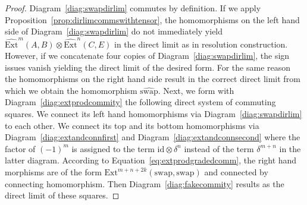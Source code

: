 \documentclass[12pt, a4paper]{article}
\numberwithin{equation}{section}
\theoremstyle{empty}
\theoremstyle{nonumberplain}
\newtheorem{proof}{Proof}
\begin{document}
\begin{proof}
Diagram~\ref{diag:swapdirlim} commutes by definition. If we apply Proposition~\ref{prop:dirlimcommswithtensor}, the homomorphisms on the left hand side of Diagram~\ref{diag:swapdirlim} do not immediately yield $\widehat{\mathrm{Ext}}^m(A, B) \otimes \widehat{\mathrm{Ext}}^n(C, E)$ in the direct limit as in resolution construction. However, if we concatenate four copies of Diagram~\ref{diag:swapdirlim}, the sign issues vanish yielding the direct limit of the desired form. For the same reason the homomorphisms on the right hand side result in the correct direct limit from which we obtain the homomorphism $\widehat{\mathrm{swap}}$. Next, we form with Diagram~\ref{diag:extprodcommity} the following direct system of commuting squares. We connect its left hand homomorphisms via Diagram~\ref{diag:swapdirlim} to each other. We connect its top and its bottom homomorphisms via Diagram~\ref{diag:extandconnfirst} and Diagram~\ref{diag:extandconnsecond} where the factor of $(-1)^m$ is assigned to the term $\mathrm{id} \otimes \delta^n$ instead of the term $\delta^{m+n}$ in the latter diagram. According to Equation~\ref{eq:extprodgradedcomm}, the right hand morphisms are of the form $\mathrm{Ext}^{m+n+2k}(\mathrm{swap}, \mathrm{swap})$ and connected by connecting homomorphism. Then Diagram~\ref{diag:fakecommity} results as the direct limit of these squares.
\end{proof}
\end{document}

